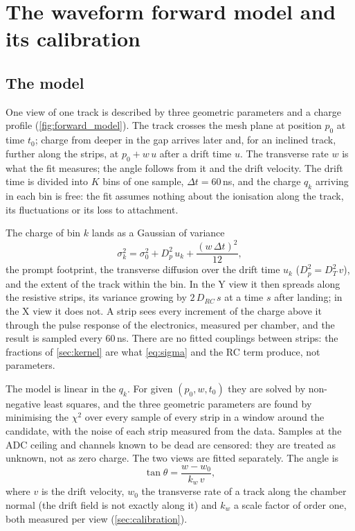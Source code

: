 \section{The waveform forward model and its calibration}\label{sec:model}

\subsection{The model}
One view of one track is described by three geometric parameters and a charge profile (\cref{fig:forward_model}).
The track crosses the mesh plane at position $p_0$ at time $t_0$; charge from deeper in the gap arrives later and,
for an inclined track, further along the strips, at $p_0 + w\,u$ after a drift time $u$. The transverse rate $w$ is
what the fit measures; the angle follows from it and the drift velocity. The drift time is divided into $K$ bins of
one sample, $\Delta t = 60$\,ns, and the charge $q_k$ arriving in each bin is free: the fit assumes nothing about the
ionisation along the track, its fluctuations or its loss to attachment.

The charge of bin $k$ lands as a Gaussian of variance
\begin{equation}
  \sigma_k^2 = \sigma_0^2 + D_p^2\,u_k + \frac{(w\,\Delta t)^2}{12},
  \label{eq:sigma}
\end{equation}
the prompt footprint, the transverse diffusion over the drift time $u_k$ ($D_p^2 = D_T^2\,v$), and the extent of the
track within the bin. In the Y view it then spreads along the resistive strips, its variance growing by
$2\,D_{RC}\,s$ at a time $s$ after landing; in the X view it does not. A strip sees every increment of the charge
above it through the pulse response of the electronics, measured per chamber, and the result is sampled every
60\,ns. There are no fitted couplings between strips: the fractions of \cref{sec:kernel} are what
\cref{eq:sigma} and the RC term produce, not parameters.

The model is linear in the $q_k$. For given $(p_0, w, t_0)$ they are solved by non-negative least squares, and
the three geometric parameters are found by minimising the $\chi^2$ over every sample of every strip in a window
around the candidate, with the noise of each strip measured from the data. Samples at the ADC ceiling and channels
known to be dead are censored: they are treated as unknown, not as zero charge. The two views are fitted
separately. The angle is
\begin{equation}
  \tan\theta = \frac{w - w_0}{k_w\,v},
  \label{eq:tan}
\end{equation}
where $v$ is the drift velocity, $w_0$ the transverse rate of a track along the chamber normal (the drift field
is not exactly along it) and $k_w$ a scale factor of order one, both measured per view (\cref{sec:calibration}).

